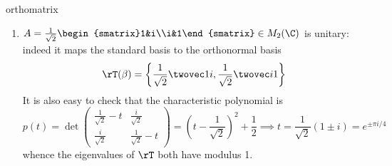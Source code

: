 \begin{examples}{}{orthomatrix}
\begin{enumerate}
	\item $A=\frac 1{\sqrt 2}\begin{smatrix}1&i\\i&1\end{smatrix}\in M_2(\C)$ is unitary: indeed it maps the standard basis to the orthonormal basis 
  \[\rT(\beta)=\left\{\frac 1{\sqrt 2}\twovec 1i, \frac 1{\sqrt 2}\twovec i1\right\}\]
  It is also easy to check that the characteristic polynomial is
  \[p(t)=\det\begin{pmatrix}
  \frac 1{\sqrt 2}-t&\frac i{\sqrt 2}\\
  \frac i{\sqrt 2}&\frac 1{\sqrt 2}-t
  \end{pmatrix} =\left(t-\frac 1{\sqrt 2}\right)^2+\frac 12\implies t=\frac 1{\sqrt 2}(1\pm i) =e^{\pm\pi i/4}\]
  whence the eigenvalues of $\rT$ both have modulus 1.


\end{enumerate}
\end{examples}
